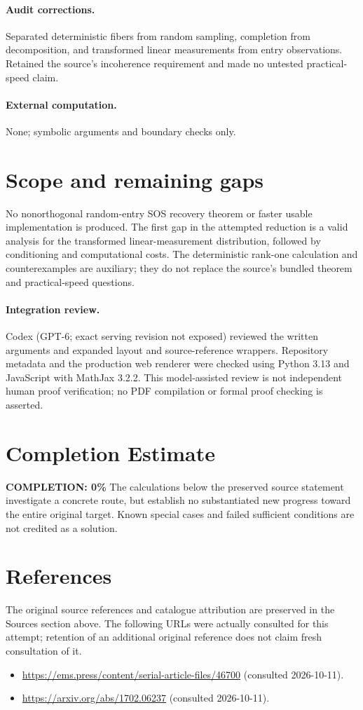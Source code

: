 \documentclass[11pt]{article}
\begin{document}
\paragraph{Audit corrections.} Separated deterministic fibers from random sampling, completion from decomposition, and transformed linear measurements from entry observations. Retained the source's incoherence requirement and made no untested practical-speed claim.
\paragraph{External computation.} None; symbolic arguments and boundary checks only.
\section{Scope and remaining gaps}
No nonorthogonal random-entry SOS recovery theorem or faster usable implementation is produced. The first gap in the attempted reduction is a valid analysis for the transformed linear-measurement distribution, followed by conditioning and computational costs. The deterministic rank-one calculation and counterexamples are auxiliary; they do not replace the source's bundled theorem and practical-speed questions.
\paragraph{Integration review.} Codex (GPT-6; exact serving revision not exposed) reviewed the written arguments and expanded layout and source-reference wrappers. Repository metadata and the production web renderer were checked using Python 3.13 and JavaScript with MathJax 3.2.2. This model-assisted review is not independent human proof verification; no PDF compilation or formal proof checking is asserted.

\section{Completion Estimate}
\noindent\textbf{COMPLETION: 0\%}
The calculations below the preserved source statement investigate a concrete route,
but establish no substantiated new progress toward the entire original target.
Known special cases and failed sufficient conditions are not credited as a solution.
\section{References}
The original source references and catalogue attribution are preserved in the
Sources section above. The following URLs were actually consulted for this attempt;
retention of an additional original reference does not claim fresh consultation of it.
\begin{itemize}
\item \url{https://ems.press/content/serial-article-files/46700} (consulted 2026-10-11). 
\item \url{https://arxiv.org/abs/1702.06237} (consulted 2026-10-11). 
\end{itemize}
\end{document}
